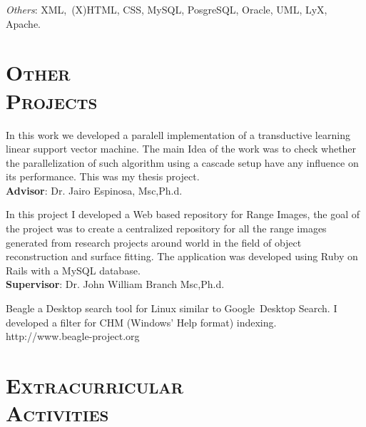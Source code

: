 \begin{resume}
\emph{Others}: XML,\ (X)HTML, CSS, MySQL, PosgreSQL, Oracle, UML, LyX, Apache.


\section{\textsc{Other\\  Projects}}

\begin{position}
In this work we developed a paralell implementation of a transductive
learning linear support vector machine. The main Idea of the work was
to check whether the parallelization of such algorithm using a cascade
setup have any influence on its performance. This was my thesis project.\\
\textbf{Advisor}:  Dr. Jairo Espinosa, Msc,Ph.d.
\end{position}

\begin{position}
 In this project I developed a Web based repository for Range Images, the goal of the
 project was to create a centralized repository for all the range
 images generated from research projects around world in the field of
 object reconstruction and surface fitting. The application was
 developed using Ruby on Rails with a MySQL database.\\
 \textbf{Supervisor}: Dr. John William Branch Msc,Ph.d.
\end{position}

\begin{position}
Beagle a Desktop search tool  for Linux similar to
Google\texttrademark  \  Desktop
Search. I developed a filter for CHM (Windows' Help format) indexing.
http://www.beagle-project.org
\end{position}

\section{\textsc{Extracurricular\\ Activities}}

\begin{formatb}
  \\
   

\end{formatb}
\end{resume}
